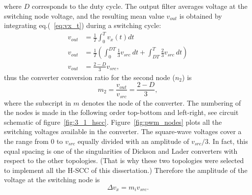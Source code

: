 where $D$ corresponds to the duty cycle. The output filter averages voltage at the switching node voltage, and the resulting mean  value $v_{out}$ is obtained by integrating eq.(~\ref{eq:vx_t}) during a switching cycle:
\begin{align}
 v_{out} & = \frac{1}{T} \int_{0}^{T}  v_x(t) dt \\[3ex]
 v_{out} & = \frac{1}{T} \left( \int_{0}^{DT} \frac{1}{3} v_{src} ~dt + \int_{DT}^{T} \frac{2}{3} v_{src} ~dt \right) \\[3ex]
 v_{out} & = \frac{2-D}{3} v_{src},
 \label{eq:int_vx_t}
\end{align}
thus the converter conversion ratio for the second node ($n_2$) is
\begin{equation}
 m_2   = \frac{v_{out}}{v_{src}} = \frac{2-D}{3},
 \label{eq:int_vx_t}
\end{equation}
where the subscript in $m$ denotes the node of the converter. The numbering of the nodes is made in the following order top-bottom and left-right, see  circuit schematic of figure~\ref{fig:3_1_hscc}. Figure~\ref{fig:pwm_nodes} plots all the switching voltages available in the converter. The square-wave voltages cover a the range from 0 to $v_{src}$ equally divided with an amplitude of $v_{src}/3$. In fact, this equal spacing is one of the singularities of Dickson and Lader converters with respect to the other topologies. (That is why these two topologies were selected to implement all the H-SCC of this dissertation.) Therefore the amplitude of the voltage at the switching node is
\begin{equation}
\Delta v_x = m_i v_{src}.
\label{eq:del_vx}
\end{equation}

